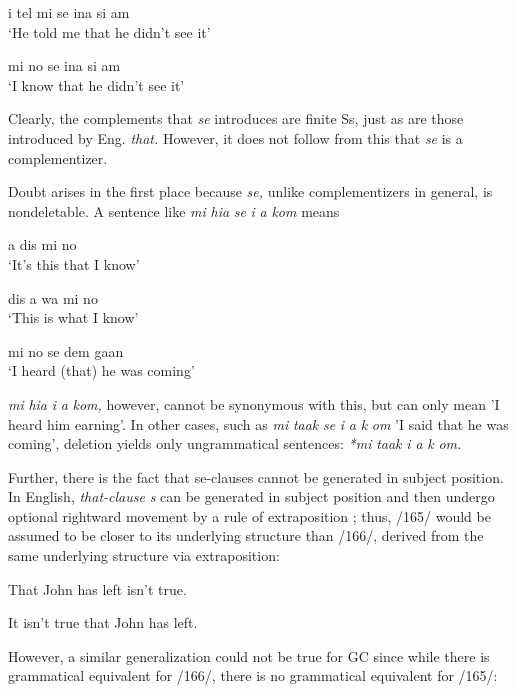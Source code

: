 \ea\label{ex:2:163}
 i tel mi se ina si am\\
\glt `He told me that he didn't see it'
\z



\ea\label{ex:2:164}
 mi no se ina si am\\
\glt `I know that he didn't see it'
\z




Clearly, the complements that \textit{se} introduces are finite Ss, just as are those introduced by Eng. \textit{that.} However, it does not follow from this that \textit{se} is a complementizer.

Doubt arises in the first place because \textit{se,} unlike complementizers in general, is nondeletable. A sentence like \textit{mi} \textit{hia} \textit{se} \textit{i} \textit{a} \textit{kom} means

\ea\label{ex:2:170}
 a dis mi no \\
\glt `It's this that I know'
\z



\ea\label{ex:2:171}
 dis a wa mi no\\
\glt `This is what I know'
\z



\ea\label{ex:2:172}
 mi no se dem gaan\\
\glt `I heard (that) he was coming'
\z

\textit{mi} \textit{hia} \textit{i} \textit{a} \textit{k}\textit{om,} however, cannot be synonymous with this, but can only mean 'I heard him earning'. In other cases, such as \textit{mi} \textit{taak} \textit{se} \textit{i} \textit{a} \textit{k} \textit{om} 'I said that he was coming', deletion yields only ungrammatical sentences: \textit{*mi} \textit{taak} \textit{i a} \textit{k} \textit{om.}

Further, there is the fact that se-clauses cannot be generated in subject position. In English, \textit{that-clause} \textit{s} can be generated in subject position and then undergo optional rightward movement by a rule of extraposition ; thus, /165/ would be assumed to be closer to its underlying structure than /166/, derived from the same underlying structure via extraposition:

\ea\label{ex:2:165}
 That John has left isn't true.
\z

\ea\label{ex:2:166}
 It isn't true that John has left.
\z

However, a similar generalization could not be true for GC since while there is grammatical equivalent for /166/, there is no grammatical equivalent for /165/:

